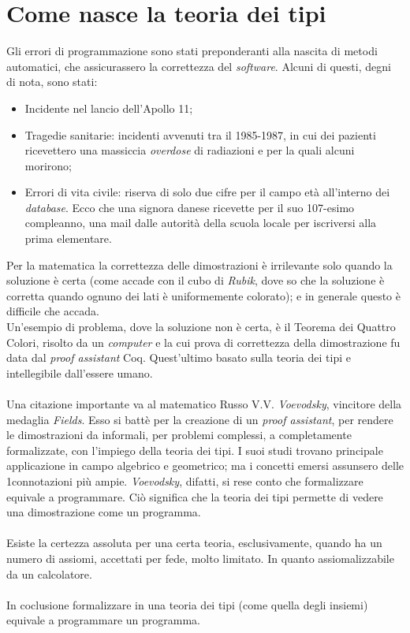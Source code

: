\section{Come nasce la teoria dei tipi}
\label{sec:come-nasce}
Gli errori di programmazione sono stati preponderanti alla nascita di metodi automatici, che assicurassero la correttezza del \textit{software}. Alcuni di questi, degni di nota, sono stati:
\begin{itemize}
\item Incidente nel lancio dell'Apollo 11;
\item Tragedie sanitarie: incidenti avvenuti tra il 1985-1987, in cui dei pazienti ricevettero una massiccia \textit{overdose} di radiazioni e per la quali alcuni morirono;
\item Errori di vita civile: riserva di solo due cifre per il campo et\`a all'interno dei \textit{database}. Ecco che una signora danese ricevette per il suo 107-esimo compleanno, una mail dalle autorit\`a della scuola locale per iscriversi alla prima elementare.
\end{itemize}
\noindent 
Per la matematica la correttezza delle dimostrazioni \`e irrilevante solo quando la soluzione \`e certa (come accade con il cubo di \textit{Rubik}, dove so che la soluzione \`e corretta quando ognuno dei lati \`e uniformemente colorato); e in generale questo \`e difficile che accada.\\
Un'esempio di problema, dove la soluzione non \`e certa, \`e il Teorema dei Quattro Colori, risolto da un \textit{computer} e la cui prova di correttezza della dimostrazione fu data dal \textit{proof assistant} Coq. Quest'ultimo basato sulla teoria dei tipi e intellegibile dall'essere umano.\\\\
Una citazione importante va al matematico Russo V.V. \textit{Voevodsky}, vincitore della medaglia \textit{ Fields}. Esso si batt\`e per la creazione di un \textit{proof assistant}, per rendere le dimostrazioni da informali, per problemi complessi, a completamente formalizzate, con l'impiego della teoria dei tipi. I suoi studi trovano principale applicazione in campo algebrico e geometrico; ma i concetti emersi assunsero delle 1connotazioni pi\`u ampie. \textit{Voevodsky}, difatti, si rese conto che formalizzare equivale a programmare. Ci\`o significa che la teoria dei tipi permette di vedere una dimostrazione come un programma.
\\\\
Esiste la certezza assoluta per una certa teoria, esclusivamente, quando ha un numero di assiomi, accettati per fede, molto limitato. In quanto assiomalizzabile da un calcolatore.
\\\\
In coclusione formalizzare in una teoria dei tipi (come quella degli insiemi) equivale a programmare un programma.

